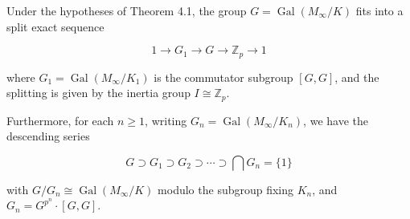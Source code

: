 Under the hypotheses of Theorem 4.1, the group $G = \operatorname{Gal}(M_\infty / K)$ fits into a split exact sequence

$$1 \to G_1 \to G \to \mathbb{Z}_p \to 1$$

where $G_1 = \operatorname{Gal}(M_\infty / K_1)$ is the commutator subgroup $[G, G]$, and the splitting is given by the inertia group $I \cong \mathbb{Z}_p$.

Furthermore, for each $n \geq 1$, writing $G_n = \operatorname{Gal}(M_\infty / K_n)$, we have the descending series

$$G \supset G_1 \supset G_2 \supset \cdots \supset \bigcap G_n = \{1\}$$

with $G/G_n \cong \operatorname{Gal}(M_\infty/K)$ modulo the subgroup fixing $K_n$, and $G_n = G^{p^n} \cdot [G, G]$.
